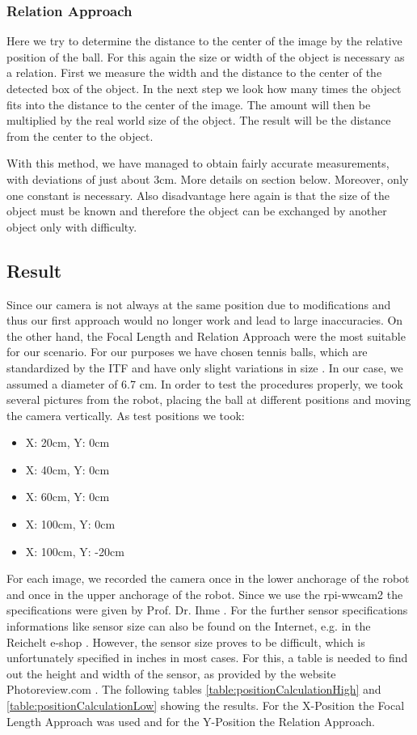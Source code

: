 \subsubsection{Relation Approach}
Here we try to determine the distance to the center of the image by the relative
position of the ball. For this again the size or width of the object is necessary as a relation. First we measure the width and the distance to the center of the detected box of the object. In the next step we look how many times the object fits into the distance to the center of the image. The amount will then be multiplied by the real world size of the object. The result will be the distance from the center to the object.

With this method, we have managed to obtain fairly accurate measurements, with
deviations of just about 3cm. More details on section below. Moreover, only one constant is necessary. Also disadvantage here again is that the size of the object must be known and therefore the object can be exchanged by another object only with difficulty.

\subsection{Result}
Since our camera is not always at the same position due to modifications and thus our first approach would no longer work and lead to large inaccuracies. 
On the other hand, the Focal Length and Relation Approach were the most suitable for our scenario. For our purposes we have chosen tennis balls, which are standardized by the ITF and have only slight variations in size \autocite{Int_TennisFederation}. In our case, we assumed a diameter of 6.7 cm. In order to test the procedures properly, we took several pictures from the robot, placing the ball at different positions and moving the camera vertically. As test positions we took:
\begin{itemize}
\item X: 20cm, Y: 0cm
\item X: 40cm, Y: 0cm
\item X: 60cm, Y: 0cm
\item X: 100cm, Y: 0cm
\item X: 100cm, Y: -20cm
\end{itemize}

For each image, we recorded the camera once in the lower anchorage of the robot and once in the upper anchorage of the robot. Since we use the rpi-wwcam2 the specifications were given by Prof. Dr. Ihme \autocite{Ihme_Latenzarme}. For the further sensor specifications informations like sensor size can also be found on the Internet, e.g. in the Reichelt e-shop \autocite{Reichelt_RPIWWCAM2}. However, the sensor size proves to be difficult, which is unfortunately specified in inches in most cases. For this, a table is needed to find out the height and width of the sensor, as provided by the website Photoreview.com \autocite{UnravellingSensor}. The following tables \autoref{table:positionCalculationHigh} and \autoref{table:positionCalculationLow} showing the results. For the X-Position the Focal Length Approach was used and for the Y-Position the Relation Approach.

